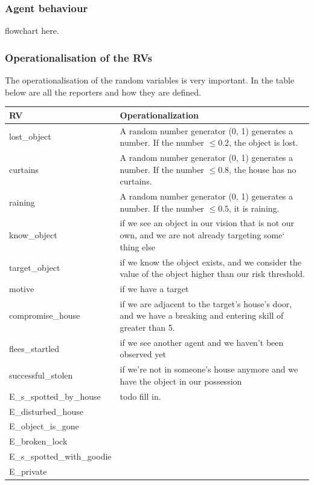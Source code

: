 \subsubsection{Agent behaviour}
flowchart here.

\subsubsection{Operationalisation of the RVs}

The operationalisation of the random variables is very important. In the table below are all the reporters and how they are defined.

\begin{adjustbox}{center}
\footnotesize
\centering
\begin{tabular}{|l|l|}
 \hline
 RV &Operationalization\\
 \hline
lost\_object   & A random number generator (0, 1) generates a number. If the number $\leq 0.2$, the object is lost.\\
curtains & A random number generator (0, 1) generates a number. If the number $\leq 0.8$, the house has no curtains.  \\
raining & A random number generator (0, 1) generates a number. If the number $\leq 0.5$, it is raining.   \\
know\_object & if we see an object in our vision that is not our own, and we are not already targeting some`
thing else  \\
target\_object & if we know the object exists, and we consider the value of the object higher than our risk threshold.  \\
motive & if we have a target \\
compromise\_house & if we are adjacent to the target's house's door, and we have a breaking and entering skill of greater than 5. \\
flees\_startled & if we see another agent and we haven't been observed yet  \\
successful\_stolen & if we're not in someone's house anymore and we have the object in our possession \\ 
E\_s\_spotted\_by\_house&  {\color{red} todo fill in}. \\ 
E\_disturbed\_house&   \\ 
E\_object\_is\_gone&   \\ 
E\_broken\_lock&   \\ 
E\_s\_spotted\_with\_goodie&   \\ 
E\_private&   \\ 
\hline
\end{tabular}
\end{adjustbox}


